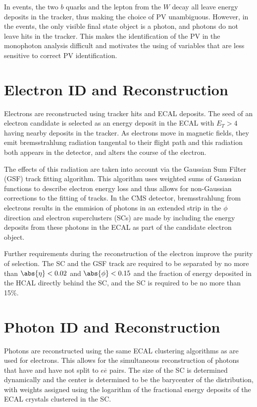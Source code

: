  In \ppwbblnbb events, the two $b$ quarks and
  the lepton from the $W$ decay all leave energy
  deposits in the tracker, thus making the choice
  of PV unambiguous.
 However, in the \pploneg events,
  the only visible final state object is a photon,
  and photons do not leave hits in the tracker.
 This makes the identification of the PV
  in the monophoton analysis difficult
  and motivates the using of variables that
  are less sensitive to correct PV identification.
  
\section{Electron ID and Reconstruction}

 Electrons are reconstructed using tracker
  hits and ECAL deposits.
 The seed of an electron candidate is selected as 
  an energy deposit in the ECAL with $E_T > 4$ \GeV
  having nearby deposits in the tracker.
 As electrons move in magnetic fields,
  they emit bremsstrahlung radiation
  tangental to their flight path
  and this radiation both appears in the detector, 
  and alters the course of the electron.

 The effects of this radiation are taken
  into account via the Gaussian Sum Filter (GSF)
  track fitting algorithm.
 This algorithm uses weighted sums of Gaussian
  functions to describe electron energy loss
  and thus allows for non-Gaussian corrections
  to the fitting of tracks.
 In the CMS detector, 
  bremsstrahlung from electrons results in the
  emmision of photons in an extended strip
  in the $\phi$ direction and electron
  superclusters (SCs) are made by 
  including the energy deposits from 
  these photons in the ECAL as part of the
  candidate electron object.

 Further requirements during the reconstruction of
  the electron improve the purity of selection.
 The SC and the GSF track are required to 
  be separated by no more than $\abs{\eta}<0.02$
  and $\abs{\phi}<0.15$ and the fraction of
  energy deposited in the HCAL directly behind
  the SC, and the SC is required to be no more
  than 15\%.
 

\section{Photon ID and Reconstruction}\label{sec:photonreco}

 Photons are reconstructed using the same ECAL
  clustering algorithms as are used for electrons.
 This allows for
  the simultaneous reconstruction of
  photons that have and have not split to $e\overline{e}$
  pairs.
 The size of the SC is determined dynamically
  and the center is determined to be the barycenter
  of the distribution, with weights assigned
  using the logarithm of the fractional energy deposits
  of the ECAL crystals clustered in the SC.

